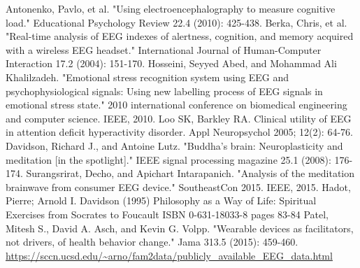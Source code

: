 \documentclass{llncs} %
\begin{document}
\begin{thebibliography}{[MT1]}
    Antonenko, Pavlo, et al. "Using electroencephalography to measure cognitive load." Educational Psychology Review 22.4 (2010): 425-438.
    Berka, Chris, et al. "Real-time analysis of EEG indexes of alertness, cognition, and memory acquired with a wireless EEG headset." International Journal of Human-Computer Interaction 17.2 (2004): 151-170.
    Hosseini, Seyyed Abed, and Mohammad Ali Khalilzadeh. "Emotional stress recognition system using EEG and psychophysiological signals: Using new labelling process of EEG signals in emotional stress state." 2010 international conference on biomedical engineering and computer science. IEEE, 2010.
    Loo SK, Barkley RA. Clinical utility of EEG in attention deficit hyperactivity disorder. Appl Neuropsychol 2005; 12(2): 64-76.
    Davidson, Richard J., and Antoine Lutz. "Buddha's brain: Neuroplasticity and meditation [in the spotlight]." IEEE signal processing magazine 25.1 (2008): 176-174.
    Surangsrirat, Decho, and Apichart Intarapanich. "Analysis of the meditation brainwave from consumer EEG device." SoutheastCon 2015. IEEE, 2015.
    Hadot, Pierre; Arnold I. Davidson (1995) Philosophy as a Way of Life: Spiritual Exercises from Socrates to Foucault ISBN 0-631-18033-8 pages 83-84
    Patel, Mitesh S., David A. Asch, and Kevin G. Volpp. "Wearable devices as facilitators, not drivers, of health behavior change." Jama 313.5 (2015): 459-460.
    \url{https://sccn.ucsd.edu/~arno/fam2data/publicly_available_EEG_data.html}



\end{thebibliography}
\end{document}
